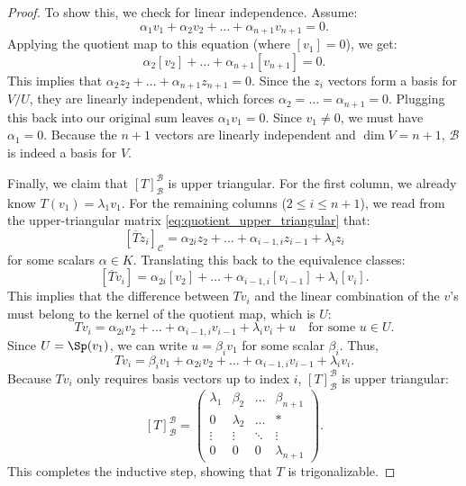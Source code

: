 \begin{proof}
  To show this, we check for linear independence. Assume:
  \[ \alpha_1 v_1 + \alpha_2 v_2 + \dots + \alpha_{n+1} v_{n+1} = 0. \]
  Applying the quotient map to this equation (where $[v_1] = 0$), we get:
  \[ \alpha_2[v_2] + \dots + \alpha_{n+1}[v_{n+1}] = 0. \]
  This implies that $\alpha_2 z_2 + \dots + \alpha_{n+1} z_{n+1} = 0$.
  Since the $z_i$ vectors form a basis for $V/U$, they are linearly independent, which forces $\alpha_2 = \dots = \alpha_{n+1} = 0$.
  Plugging this back into our original sum leaves $\alpha_1 v_1 = 0$. Since $v_1 \ne 0$, we must have $\alpha_1 = 0$.
  Because the $n+1$ vectors are linearly independent and $\dim V = n+1$, $\mathcal{B}$ is indeed a basis for $V$.

  Finally, we claim that $[T]_{\mathcal{B}}^{\mathcal{B}}$ is upper triangular.
  For the first column, we already know $T(v_1) = \lambda_1 v_1$.
  For the remaining columns ($2 \le i \le n+1$), we read from the upper-triangular matrix \eqref{eq:quotient_upper_triangular} that:
  \[ [\overline{T}z_i]_{\mathcal{C}} = \alpha_{2i}z_2 + \dots + \alpha_{i-1, i}z_{i-1} + \lambda_i z_i \]
  for some scalars $\alpha \in K$. Translating this back to the equivalence classes:
  \[ [\overline{T}v_i] = \alpha_{2i}[v_2] + \dots + \alpha_{i-1, i}[v_{i-1}] + \lambda_i [v_i]. \]
  This implies that the difference between $Tv_i$ and the linear combination of the $v$'s must belong to the kernel of the quotient map, which is $U$:
  \[ Tv_i = \alpha_{2i}v_2 + \dots + \alpha_{i-1, i}v_{i-1} + \lambda_i v_i + u \quad \text{for some } u \in U. \]
  Since $U = \Sp(v_1)$, we can write $u = \beta_i v_1$ for some scalar $\beta_i$. Thus,
  \[ Tv_i = \beta_i v_1 + \alpha_{2i}v_2 + \dots + \alpha_{i-1, i}v_{i-1} + \lambda_i v_i. \]
  Because $Tv_i$ only requires basis vectors up to index $i$, $[T]_{\mathcal{B}}^{\mathcal{B}}$ is upper triangular:
  \[ [T]_{\mathcal{B}}^{\mathcal{B}} = \begin{pmatrix} \lambda_1 & \beta_2 & \dots & \beta_{n+1} \\ 0 & \lambda_2 & \dots & * \\ \vdots & \vdots & \ddots & \vdots \\ 0 & 0 & 0 & \lambda_{n+1} \end{pmatrix}. \]
  This completes the inductive step, showing that $T$ is trigonalizable.
\end{proof}

\setcounter{section}{3} %

